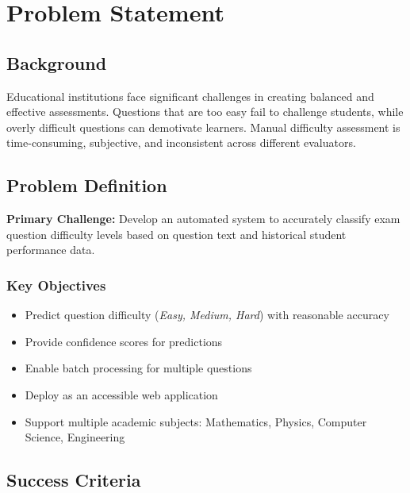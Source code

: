 \documentclass[12pt,a4paper]{article}
\begin{document}
\vspace{1em}

\section{Problem Statement}

\subsection{Background}

Educational institutions face significant challenges in creating balanced and effective
assessments. Questions that are too easy fail to challenge students, while overly difficult
questions can demotivate learners. Manual difficulty assessment is time-consuming,
subjective, and inconsistent across different evaluators.

\subsection{Problem Definition}

\textbf{Primary Challenge:} Develop an automated system to accurately classify exam
question difficulty levels based on question text and historical student performance data.

\subsubsection*{Key Objectives}
\begin{itemize}[leftmargin=1.5em, itemsep=3pt]
  \item Predict question difficulty (\textit{Easy, Medium, Hard}) with reasonable accuracy
  \item Provide confidence scores for predictions
  \item Enable batch processing for multiple questions
  \item Deploy as an accessible web application
  \item Support multiple academic subjects: Mathematics, Physics, Computer Science, Engineering
\end{itemize}

\subsection{Success Criteria}
\end{document}
